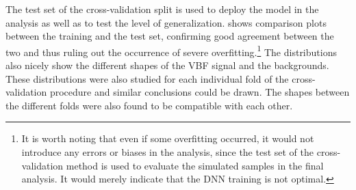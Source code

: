 
The test set of the cross-validation split is used to deploy the model in the analysis as well as to test the level of generalization.
 shows comparison plots between the training and the test set, confirming good agreement between the two and thus ruling out the occurrence of severe overfitting.\footnote{It is worth noting that even if some overfitting occurred, it would not introduce any errors or biases in the analysis, since the test set of the cross-validation method is used to evaluate the simulated samples in the final analysis. It would merely indicate that the DNN training is not optimal.}
The distributions also nicely show the different shapes of the VBF signal and the backgrounds.
These distributions were also studied for each individual fold of the cross-validation procedure and similar conclusions could be drawn. The shapes between the different folds were also found to be compatible with each other. 


